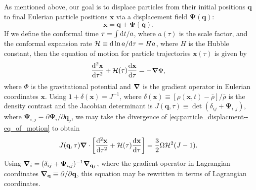 As mentioned above, our goal is to displace particles from their initial positions $\mathbf{q}$ to final Eulerian particle positions $\mathbf{x}$ via a displacement field $\boldsymbol{\Psi}(\mathbf{q})$:
\begin{equation}
	\mathbf{x} = \mathbf{q} + \boldsymbol{\Psi}(\mathbf{q}).
\end{equation}
If we define the conformal time $\tau = \int {\rm {d}} t / a$, where $a(\tau)$ is the scale factor, and the conformal expansion rate $\mathcal{H} \equiv {\rm {d}} \ln a/{\rm {d}} \tau = H a$, where $H$ is the Hubble constant, then the equation of motion for particle trajectories $\mathbf{x}(\tau)$ is given by
\begin{equation} \label{eq:particle_displacment--eq_of_motion}
	\frac{{\rm {d}}^{2} \mathbf{x}}{{\rm {d}} \tau^{2}} + \mathcal{H}(\tau) \frac{{\rm {d}} \mathbf{x}}{{\rm {d}} \tau} = -{\boldsymbol{\nabla}} \Phi,
\end{equation}
where $\Phi$ is the gravitational potential and ${\boldsymbol{\nabla}}$ is the gradient operator in Eulerian coordinates $\mathbf{x}$.  Using $1 + \delta(\mathbf{x}) = J^{-1}$, where $\delta(\mathbf{x}) \equiv [\rho(\mathbf{x},t) - \bar{\rho}] / \bar{\rho}$ is the density contrast and the Jacobian determinant is $J(\mathbf{q}, \tau) \equiv \det(\delta_{ij} + \boldsymbol{\Psi}_{i,j})$, where $\boldsymbol{\Psi}_{i,j} \equiv \partial \boldsymbol{\Psi}_{i} / \partial \mathbf{q}_{j}$, we may take the divergence of \ref{eq:particle_displacment--eq_of_motion} to obtain
\begin{equation} \label{eq:particle_displacement--div_eq_of_motion}
	J(\mathbf{q}, \tau) {\boldsymbol{\nabla}} \cdot \left[ \frac{{\rm {d}}^{2} \mathbf{x}}{{\rm {d}} \tau^{2}} + \mathcal{H}(\tau) \frac{{\rm {d}} \mathbf{x}}{{\rm {d}} \tau} \right]
	= \frac{3}{2} \Omega \mathcal{H}^{2}(J - 1).
\end{equation}
Using ${\boldsymbol{\nabla}}_{i} = (\delta_{ij} + \boldsymbol{\Psi}_{i,j})^{-1} {\boldsymbol{\nabla}}_{\mathbf{q}_{j}}$, where the gradient operator in Lagrangian coordinates ${\boldsymbol{\nabla}}_{\mathbf{q}} \equiv \partial / \partial \mathbf{q}$, this equation may be rewritten in terms of Lagrangian coordinates.

